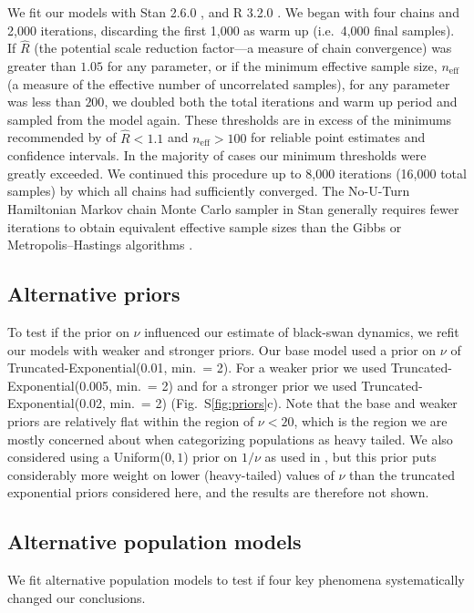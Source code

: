 We fit our models with Stan 2.6.0 \citep{stan-manual2015, hoffman2014}, and R
3.2.0 \citep{r2015}. We began with four chains and 2,000 iterations, discarding
the first 1,000 as warm up (i.e.~4,000 final samples). If \(\hat{R}\) (the
potential scale reduction factor---a measure of chain convergence) was greater
than \(1.05\) for any parameter, or if the minimum effective sample size,
\(n_\mathrm{eff}\) (a measure of the effective number of uncorrelated samples),
for any parameter was less than \(200\), we doubled both the total iterations
and warm up period and sampled from the model again. These thresholds are in
excess of the minimums recommended by \citet{gelman2006a} of
\(\hat{R} < 1.1\) and \(n_\mathrm{eff} > 100\) for reliable point estimates and
confidence intervals. In the majority of cases our minimum thresholds were
greatly exceeded. We continued this procedure up to 8,000 iterations (16,000
total samples) by which all chains had sufficiently converged.
The No-U-Turn Hamiltonian Markov chain Monte Carlo sampler in Stan generally
requires fewer iterations to obtain equivalent effective sample sizes than the
Gibbs or Metropolis--Hastings algorithms \citep{stan-manual2015}.

\subsection{Alternative priors}

To test if the prior on \(\nu\) influenced our estimate of black-swan dynamics,
we refit our models with weaker and stronger priors. Our base model used a
prior on \(\nu\) of Truncated-Exponential(0.01, min.\ = 2). For a weaker prior
we used Truncated-Exponential(0.005, min.\ = 2) and for a stronger prior we
used Truncated-Exponential(0.02, min.\ = 2) (Fig.~S\ref{fig:priors}c). Note that
the base and weaker priors are relatively flat within the region of \(\nu <
20\), which is the region we are mostly concerned about when categorizing
populations as heavy tailed. We also considered using a Uniform(\(0, 1\))
prior on \(1/\nu\) as used in \citet{gelman2014}, but this
prior puts considerably more weight on lower (heavy-tailed) values of \(\nu\)
than the truncated exponential priors considered here,
and the results are therefore not shown.

\subsection{Alternative population models} We fit alternative population models to
test if four key phenomena systematically changed our conclusions.

